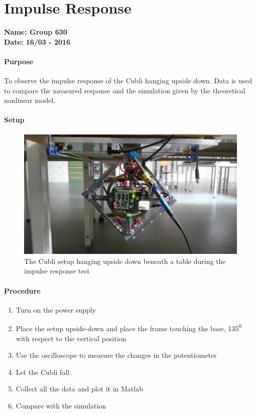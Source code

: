 \chapter{Impulse Response}\label{impulseResponseAppendix} 
\textbf{Name: Group 630}\\
\textbf{Date: 16/03 - 2016}

\subsubsection{Purpose}
To observe the impulse response of the Cubli hanging upside down.
Data is used to compare the measured response and the simulation given by the theoretical nonlinear model.

\subsubsection{Setup}
\begin{figure}[H] 
	\centering 
	\includegraphics[scale=0.1]{figures/impulseResponseSetup}
	\caption{The Cubli setup hanging upside down beneath a table during the impulse response test}
	\label{impulseResponseTestPicture}
\end{figure} 

\subsubsection{Procedure}
\begin{enumerate}
	\item Turn on the power supply
	\item Place the setup upside-down and place the frame touching the base, \si{135^0} with respect to the vertical position
	\item Use the oscilloscope to measure the changes in the potentiometer 
	\item Let the Cubli fall
	\item Collect all the data and plot it in Matlab
	\item Compare with the simulation 	
\end{enumerate}

